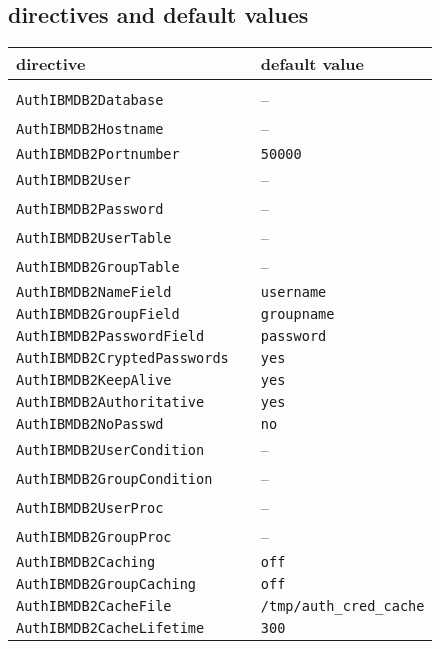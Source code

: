 \documentclass[11pt,letterpaper]{article}
\begin{document}
\begin{appendix}
\section{directives and default values} \label{default}
\vspace{5ex}
\begin{tabular}{@{} lll @{}}
directive & & default value \\
\hline
& & \\
{\tt AuthIBMDB2Database} & & -- \\[0.5ex]
{\tt AuthIBMDB2Hostname} & & -- \\[0.5ex]
{\tt AuthIBMDB2Portnumber} & & {\tt 50000} \\[0.5ex]
{\tt AuthIBMDB2User} & & -- \\[0.5ex]
{\tt AuthIBMDB2Password} & & -- \\[0.5ex]
{\tt AuthIBMDB2UserTable} & & -- \\[0.5ex]
{\tt AuthIBMDB2GroupTable} & & -- \\[0.5ex]
{\tt AuthIBMDB2NameField} & & {\tt username} \\[0.5ex]
{\tt AuthIBMDB2GroupField} & & {\tt groupname} \\[0.5ex]
{\tt AuthIBMDB2PasswordField} & & {\tt password} \\[0.5ex]
{\tt AuthIBMDB2CryptedPasswords} & & {\tt yes} \\[0.5ex]
{\tt AuthIBMDB2KeepAlive} & & {\tt yes} \\[0.5ex]
{\tt AuthIBMDB2Authoritative} & & {\tt yes} \\[0.5ex] 
{\tt AuthIBMDB2NoPasswd} & & {\tt no} \\[0.5ex]
{\tt AuthIBMDB2UserCondition} & & -- \\[0.5ex]
{\tt AuthIBMDB2GroupCondition} & & -- \\[0.5ex]
{\tt AuthIBMDB2UserProc} & & -- \\[0.5ex]
{\tt AuthIBMDB2GroupProc} & & -- \\[0.5ex]
{\tt AuthIBMDB2Caching} & & {\tt off} \\[0.5ex]
{\tt AuthIBMDB2GroupCaching} & & {\tt off} \\[0.5ex]
{\tt AuthIBMDB2CacheFile} & & {\tt /tmp/auth\_cred\_cache} \\[0.5ex]
{\tt AuthIBMDB2CacheLifetime} & & {\tt 300} \\[0.5ex]
\end{tabular}
\newpage


\newpage


\end{appendix}
\end{document}
